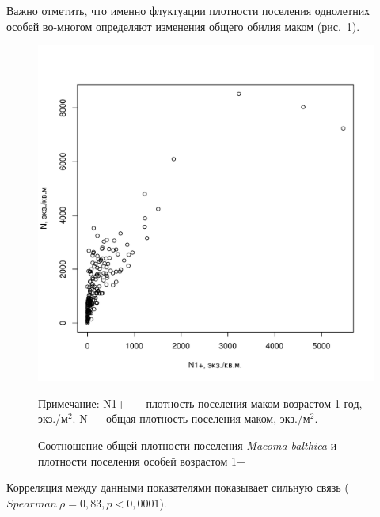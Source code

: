 Важно отметить, что именно флуктуации плотности поселения однолетних особей во-многом определяют изменения общего обилия маком (рис.~\ref{ris:N1year_vs_Nall}).
    \begin{figure}[p]
        \includegraphics[width=\textwidth]{../White_Sea/oneyear_all_Kandalaksha_all/N1y_vs_N2_1.pdf}
    \caption{Соотношение общей плотности поселения {\it Macoma balthica} и плотности поселения особей возрастом 1+}
    \label{ris:N1year_vs_Nall}

	\footnotesize{Примечание: N1+~--- плотность поселения маком возрастом 1 год, экз./м$^2$. N --- общая плотность поселения маком, экз./м$^2$.}
    \end{figure}
Корреляция между данными показателями показывает сильную связь ($Spearman\ \rho = 0,83, p < 0,0001$).

